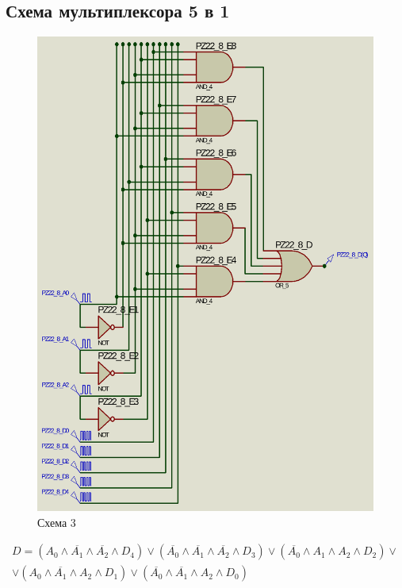 \documentclass{article}
\begin{document}
\begin{normalsize}
	\section*{Схема мультиплексора 5 в 1}
	\begin{figure}[H]
		\centering
		\includegraphics[scale=0.34]{s3}	
		\caption{Схема 3}
	\end{figure}

	\begin{Large}
		\begin{gather}
			D=(A_0\land\overline{A_1}\land\overline{A_2}\land D_4)\lor (\overline{A_0}\land\overline{A_1}\land\overline{A_2}\land D_3)\lor (\overline{A_0}\land A_1\land A_2\land D_2)\lor\nonumber\\\lor (A_0\land\overline{A_1}\land A_2\land D_1)\lor (\overline{A_0}\land\overline{A_1}\land A_2\land D_0)\nonumber
		\end{gather}
	\end{Large}


\end{normalsize}
\end{document}
